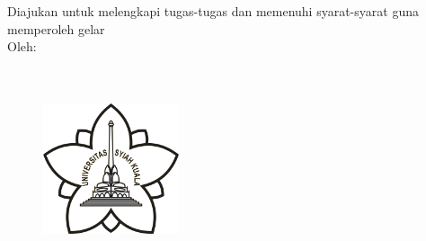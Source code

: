 %
%
%

\begin{titlepage}

    \begin{center}
        \vspace*{4em}
        {\fontsize{20}{20}
            \textbf{\Judul} \\[3em]
        }
        {\fontsize{16}{20}
            \textbf{\Type} \\[3em] 
        }
        {\fontsize{12}{20}
            {Diajukan untuk melengkapi tugas-tugas dan memenuhi syarat-syarat guna memperoleh gelar 
            \gelar} \\[3em]
        }
        {\fontsize{14}{20}
            {Oleh:} \\[3em]
        }
        {\fontsize{14}{20}
            \underline{\bo{\Penulis}} \\
            \underline{\bo{\npm}} \\[3em]
        }
        
        \begin{figure}
            \begin{center}
                \includegraphics[width=4cm]{_internals/usk_logo.png}
            \end{center}
        \end{figure}    
        \vspace*{3em}
        

    \end{center}
\end{titlepage}